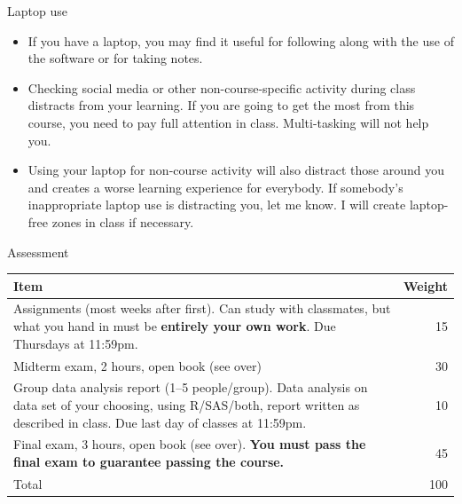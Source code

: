 \documentclass[
  ignorenonframetext,
]{beamer}
\providecommand{\tightlist}{%
  \setlength{\itemsep}{0pt}\setlength{\parskip}{0pt}}
\begin{document}
\begin{frame}{Laptop use}
\protect\hypertarget{laptop-use}{}

\begin{itemize}
\tightlist
\item
  If you have a laptop, you may find it useful for following along with
  the use of the software or for taking notes.
\item
  Checking social media or other non-course-specific activity during
  class distracts from your learning. If you are going to get the most
  from this course, you need to pay full attention in class.
  Multi-tasking will not help you.
\item
  Using your laptop for non-course activity will also distract those
  around you and creates a worse learning experience for everybody. If
  somebody's inappropriate laptop use is distracting you, let me know. I
  will create laptop-free zones in class if necessary.
\end{itemize}

\end{frame}

\begin{frame}{Assessment}
\protect\hypertarget{assessment}{}

\begin{tabular}{p{3.5in}r}
    \hline
    Item & Weight\\
    \hline
    Assignments (most weeks after first). Can study with classmates, but what you hand in must
    be \textbf{entirely your own work}. Due Thursdays at 11:59pm. & 15\\
    \hline
    Midterm exam, 2 hours, open book (see over) & 30\\
    \hline
    Group data analysis report (1--5 people/group). Data analysis on data set of your choosing,
    using R/SAS/both, report written as described in class.
    Due last
    day of classes at 11:59pm. & 10 \\
    \hline
    Final exam, 3 hours, open book (see over). \textbf{You must pass
    the final exam to guarantee passing the course.} & 45\\
    \hline
    Total & 100\\
    \hline
  \end{tabular}

\end{frame}
\end{document}
